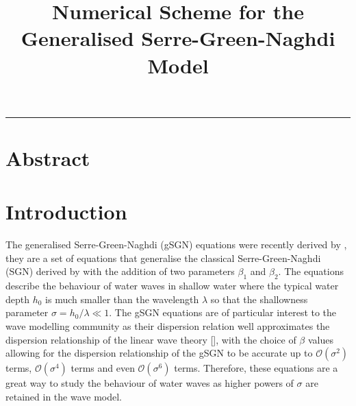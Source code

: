 \documentclass[10pt]{elsarticle}
\title{Numerical Scheme for the Generalised Serre-Green-Naghdi Model}
\begin{document}
\maketitle

\vspace{-0.3in}
\noindent
\rule{\linewidth}{0.4pt}

%


\section{Abstract}



\section{Introduction}
The generalised Serre-Green-Naghdi (gSGN) equations were recently derived by \citet{Clamond-Dutykh-2018-237}, they are a set of equations that generalise the classical Serre-Green-Naghdi (SGN) derived by \citet{Serre-F-1953-857} with the addition of two parameters $\beta_1$ and $\beta_2$. The equations describe the behaviour of water waves in shallow water where the typical water depth $h_0$ is much smaller than the wavelength $\lambda$ so that the shallowness parameter $\sigma = h_0/\lambda \ll 1$. The gSGN equations are of particular interest to the wave modelling community as their dispersion relation well approximates the dispersion relationship of the linear wave theory [], with the choice of $\beta$ values allowing for the dispersion relationship of the gSGN to be accurate up to $\mathcal{O}\left(\sigma^2\right)$ terms, $\mathcal{O}\left(\sigma^4\right)$ terms and even $\mathcal{O}\left(\sigma^6\right)$ terms. Therefore, these equations are a great way to study the behaviour of water waves as higher powers of $\sigma$ are retained in the wave model. 
\end{document}

